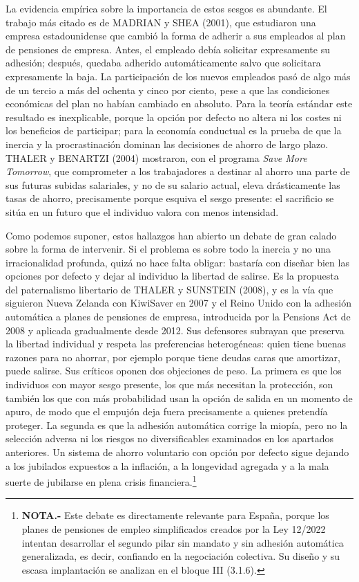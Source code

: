 \documentclass[10pt,a4paper]{article}
\begin{document}
La evidencia empírica sobre la importancia de estos sesgos es abundante. El trabajo más citado es de MADRIAN y SHEA (2001), que estudiaron una empresa estadounidense que cambió la forma de adherir a sus empleados al plan de pensiones de empresa. Antes, el empleado debía solicitar expresamente su adhesión; después, quedaba adherido automáticamente salvo que solicitara expresamente la baja. La participación de los nuevos empleados pasó de algo más de un tercio a más del ochenta y cinco por ciento, pese a que las condiciones económicas del plan no habían cambiado en absoluto. Para la teoría estándar este resultado es inexplicable, porque la opción por defecto no altera ni los costes ni los beneficios de participar; para la economía conductual es la prueba de que la inercia y la procrastinación dominan las decisiones de ahorro de largo plazo. THALER y BENARTZI (2004) mostraron, con el programa \textit{Save More Tomorrow}, que comprometer a los trabajadores a destinar al ahorro una parte de sus futuras subidas salariales, y no de su salario actual, eleva drásticamente las tasas de ahorro, precisamente porque esquiva el sesgo presente: el sacrificio se sitúa en un futuro que el individuo valora con menos intensidad.

Como podemos suponer, estos hallazgos han abierto un debate de gran calado sobre la forma de intervenir. Si el problema es sobre todo la inercia y no una irracionalidad profunda, quizá no hace falta obligar: bastaría con diseñar bien las opciones por defecto y dejar al individuo la libertad de salirse. Es la propuesta del paternalismo libertario de THALER y SUNSTEIN (2008), y es la vía que siguieron Nueva Zelanda con KiwiSaver en 2007 y el Reino Unido con la adhesión automática a planes de pensiones de empresa, introducida por la Pensions Act de 2008 y aplicada gradualmente desde 2012. Sus defensores subrayan que preserva la libertad individual y respeta las preferencias heterogéneas: quien tiene buenas razones para no ahorrar, por ejemplo porque tiene deudas caras que amortizar, puede salirse. Sus críticos oponen dos objeciones de peso. La primera es que los individuos con mayor sesgo presente, los que más necesitan la protección, son también los que con más probabilidad usan la opción de salida en un momento de apuro, de modo que el empujón deja fuera precisamente a quienes pretendía proteger. La segunda es que la adhesión automática corrige la miopía, pero no la selección adversa ni los riesgos no diversificables examinados en los apartados anteriores. Un sistema de ahorro voluntario con opción por defecto sigue dejando a los jubilados expuestos a la inflación, a la longevidad agregada y a la mala suerte de jubilarse en plena crisis financiera.\footnote{%
    \textbf{NOTA.-} Este debate es directamente relevante para España, porque los planes de pensiones de empleo simplificados creados por la Ley 12/2022 intentan desarrollar el segundo pilar sin mandato y sin adhesión automática generalizada, es decir, confiando en la negociación colectiva. Su diseño y su escasa implantación se analizan en el bloque III (3.1.6).
}
\end{document}
